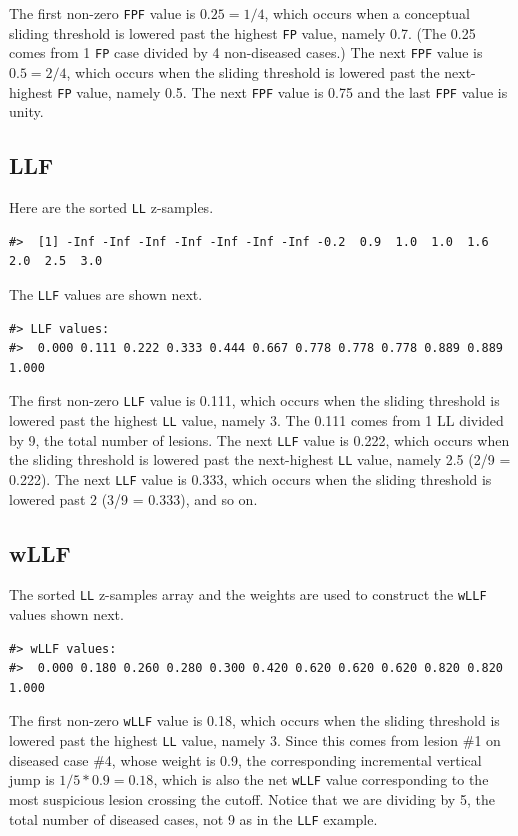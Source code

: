 \documentclass[
]{book}
\begin{document}
The first non-zero \texttt{FPF} value is \(0.25 = 1/4\), which occurs when a conceptual sliding threshold is lowered past the highest \texttt{FP} value, namely 0.7. (The 0.25 comes from 1 \texttt{FP} case divided by 4 non-diseased cases.) The next \texttt{FPF} value is \(0.5 = 2/4\), which occurs when the sliding threshold is lowered past the next-highest \texttt{FP} value, namely 0.5. The next \texttt{FPF} value is 0.75 and the last \texttt{FPF} value is unity.

\hypertarget{llf}{%
\subsection{LLF}\label{llf}}

Here are the sorted \texttt{LL} z-samples.

\begin{verbatim}
#>  [1] -Inf -Inf -Inf -Inf -Inf -Inf -Inf -0.2  0.9  1.0  1.0  1.6  2.0  2.5  3.0
\end{verbatim}

The \texttt{LLF} values are shown next.

\begin{verbatim}
#> LLF values:
#>  0.000 0.111 0.222 0.333 0.444 0.667 0.778 0.778 0.778 0.889 0.889 1.000
\end{verbatim}

The first non-zero \texttt{LLF} value is 0.111, which occurs when the sliding threshold is lowered past the highest \texttt{LL} value, namely 3. The 0.111 comes from 1 LL divided by 9, the total number of lesions. The next \texttt{LLF} value is 0.222, which occurs when the sliding threshold is lowered past the next-highest \texttt{LL} value, namely 2.5 (2/9 = 0.222). The next \texttt{LLF} value is 0.333, which occurs when the sliding threshold is lowered past 2 (3/9 = 0.333), and so on.

\hypertarget{wllf}{%
\subsection{wLLF}\label{wllf}}

The sorted \texttt{LL} z-samples array and the weights are used to construct the \texttt{wLLF} values shown next.

\begin{verbatim}
#> wLLF values:
#>  0.000 0.180 0.260 0.280 0.300 0.420 0.620 0.620 0.620 0.820 0.820 1.000
\end{verbatim}

The first non-zero \texttt{wLLF} value is 0.18, which occurs when the sliding threshold is lowered past the highest \texttt{LL} value, namely 3. Since this comes from lesion \#1 on diseased case \#4, whose weight is 0.9, the corresponding incremental vertical jump is \(1/5*0.9 = 0.18\), which is also the net \texttt{wLLF} value corresponding to the most suspicious lesion crossing the cutoff. Notice that we are dividing by 5, the total number of diseased cases, not 9 as in the \texttt{LLF} example.
\end{document}
